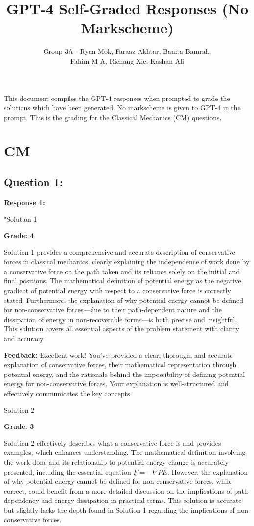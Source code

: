 \documentclass[a4paper,11pt]{article}
\begin{document}
\title{GPT-4 Self-Graded Responses (No Markscheme)}
\author{Group 3A - Ryan Mok, Faraaz Akhtar, Banita Bamrah, \\ Fahim M A, Richang Xie, Kashan Ali }
\date{}
\maketitle

This document compiles the GPT-4 responses when prompted to grade the solutions which have been generated. No markscheme is given to GPT-4 in the prompt. This is the grading for the Classical Mechanics (CM) questions. 

\section{CM}

\subsection*{Question 1:}

\textbf{Response 1:}

"Solution 1

\textbf{Grade: 4}

Solution 1 provides a comprehensive and accurate description of conservative forces in classical mechanics, clearly explaining the independence of work done by a conservative force on the path taken and its reliance solely on the initial and final positions. The mathematical definition of potential energy as the negative gradient of potential energy with respect to a conservative force is correctly stated. Furthermore, the explanation of why potential energy cannot be defined for non-conservative forces---due to their path-dependent nature and the dissipation of energy in non-recoverable forms---is both precise and insightful. This solution covers all essential aspects of the problem statement with clarity and accuracy.

\textbf{Feedback:} Excellent work! You've provided a clear, thorough, and accurate explanation of conservative forces, their mathematical representation through potential energy, and the rationale behind the impossibility of defining potential energy for non-conservative forces. Your explanation is well-structured and effectively communicates the key concepts.

Solution 2

\textbf{Grade: 3}

Solution 2 effectively describes what a conservative force is and provides examples, which enhances understanding. The mathematical definition involving the work done and its relationship to potential energy change is accurately presented, including the essential equation \( \underline{F} = -\nabla PE \). However, the explanation of why potential energy cannot be defined for non-conservative forces, while correct, could benefit from a more detailed discussion on the implications of path dependency and energy dissipation in practical terms. This solution is accurate but slightly lacks the depth found in Solution 1 regarding the implications of non-conservative forces.
\end{document}
